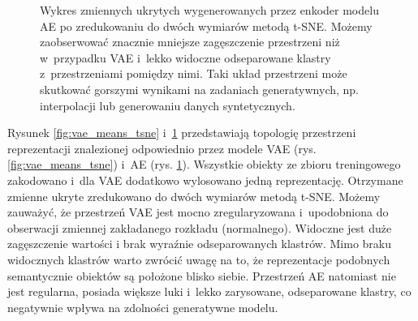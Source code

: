 \documentclass{iithesis}
\begin{document}
\begin{figure}
    \caption{\label{fig:ae_means_tsne} Wykres zmiennych ukrytych wygenerowanych przez enkoder modelu AE
    po zredukowaniu do dwóch wymiarów metodą t-SNE. Możemy zaobserwować znacznie mniejsze zagęszczenie
    przestrzeni niż w~przypadku VAE i~lekko widoczne odseparowane klastry z~przestrzeniami pomiędzy nimi.
    Taki układ przestrzeni może skutkować gorszymi wynikami na zadaniach generatywnych, np. interpolacji
    lub generowaniu danych syntetycznych.}
\end{figure}

Rysunek \ref{fig:vae_means_tsne} i~\ref{fig:ae_means_tsne} przedstawiają topologię przestrzeni reprezentacji
znalezionej odpowiednio przez modele VAE (rys. \ref{fig:vae_means_tsne}) i~AE (rys. \ref{fig:ae_means_tsne}).
Wszystkie obiekty ze zbioru treningowego zakodowano i~dla VAE dodatkowo wylosowano jedną reprezentację.
Otrzymane zmienne ukryte zredukowano do dwóch wymiarów metodą t-SNE.
Możemy zauważyć, że przestrzeń VAE jest mocno zregularyzowana i~upodobniona do obserwacji
zmiennej zakładanego rozkładu (normalnego). Widoczne jest duże zagęszczenie wartości
i brak wyraźnie odseparowanych klastrów. Mimo braku widocznych klastrów warto
zwrócić uwagę na to, że reprezentacje podobnych semantycznie obiektów są położone blisko siebie.
Przestrzeń AE natomiast nie jest regularna, posiada większe luki i~lekko
zarysowane, odseparowane klastry, co negatywnie wpływa na zdolności generatywne modelu.
\end{document}

